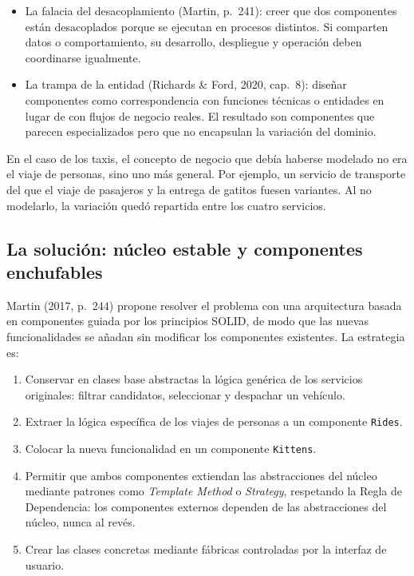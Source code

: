 \documentclass[12pt,a4paper]{article}
\begin{document}
\begin{itemize}[label=$\cdot$]
  \item La falacia del desacoplamiento (Martin, p.~241): creer que dos componentes están desacoplados porque se ejecutan en procesos distintos. Si comparten datos o comportamiento, su desarrollo, despliegue y operación deben coordinarse igualmente.
  \item La trampa de la entidad (Richards \& Ford, 2020, cap.~8): diseñar componentes como correspondencia con funciones técnicas o entidades en lugar de con flujos de negocio reales. El resultado son componentes que parecen especializados pero que no encapsulan la variación del dominio.
\end{itemize}

En el caso de los taxis, el concepto de negocio que debía haberse modelado no era el viaje de personas, sino uno más general. Por ejemplo, un servicio de transporte del que el viaje de pasajeros y la entrega de gatitos fuesen variantes. Al no modelarlo, la variación quedó repartida entre los cuatro servicios.

\subsection{La solución: núcleo estable y componentes enchufables}

Martin (2017, p.~244) propone resolver el problema con una arquitectura basada en componentes guiada por los principios SOLID, de modo que las nuevas funcionalidades se añadan sin modificar los componentes existentes. La estrategia es:

\begin{enumerate}[label=\arabic*.,leftmargin=*]
  \item Conservar en clases base abstractas la lógica genérica de los servicios originales: filtrar candidatos, seleccionar y despachar un vehículo.
  \item Extraer la lógica específica de los viajes de personas a un componente \texttt{Rides}.
  \item Colocar la nueva funcionalidad en un componente \texttt{Kittens}.
  \item Permitir que ambos componentes extiendan las abstracciones del núcleo mediante patrones como \emph{Template Method} o \emph{Strategy}, respetando la Regla de Dependencia: los componentes externos dependen de las abstracciones del núcleo, nunca al revés.
  \item Crear las clases concretas mediante fábricas controladas por la interfaz de usuario.
\end{enumerate}
\end{document}
